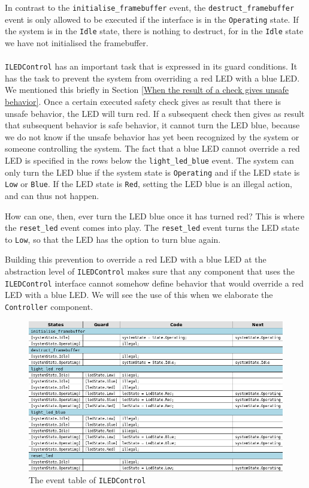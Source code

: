 \documentclass[12pt]{scrreprt}
\begin{document}
\begin{appendices}
In contrast to the \texttt{initialise\_framebuffer} event, the \texttt{destruct\_framebuffer} event is only allowed to be executed if the interface is in the \texttt{Operating} state. If the system is in the \texttt{Idle} state, there is nothing to destruct, for in the \texttt{Idle} state we have not initialised the framebuffer.
\\\\
\texttt{ILEDControl} has an important task that is expressed in its guard conditions. It has the task to prevent the system from overriding a red LED with a blue LED. We mentioned this briefly in Section \ref{When the result of a check gives unsafe behavior}. Once a certain executed safety check gives as result that there is unsafe behavior, the LED will turn red. If a subsequent check then gives as result that subsequent behavior is safe behavior, it cannot turn the LED blue, because we do not know if the unsafe behavior has yet been recognized by the system or someone controlling the system. The fact that a blue LED cannot override a red LED is specified in the rows below the \texttt{light\_led\_blue} event. The system can only turn the LED blue if the system state is \texttt{Operating} and if the LED state is \texttt{Low} or \texttt{Blue}. If the LED state is \texttt{Red}, setting the LED blue is an illegal action, and can thus not happen.
\par
How can one, then, ever turn the LED blue once it has turned red? This is where the \texttt{reset\_led} event comes into play. The \texttt{reset\_led} event turns the LED state to \texttt{Low}, so that the LED has the option to turn blue again.
\par
Building this prevention to override a red LED with a blue LED at the abstraction level of \texttt{ILEDControl} makes sure that any component that uses the \texttt{ILEDControl} interface cannot somehow define behavior that would override a red LED with a blue LED. We will see the use of this when we elaborate the \texttt{Controller} component.


\begin{figure}[H]
    \centering
    \includegraphics[width=\textwidth]{Figures/results/modelling_figures/ILEDControl/ILEDControl_event_table.png}
    \caption{The event table of \texttt{ILEDControl}}
    \label{fig:ILEDControl_event_table}
\end{figure}


\end{appendices}
\end{document}
